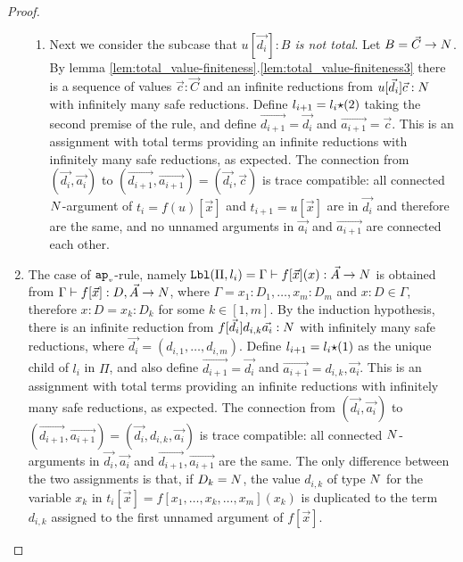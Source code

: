 \begin{proof}
\begin{enumerate}
\begin{enumerate}
\item
  Next we consider the subcase that \emph{$u[\vec{d_i}]:B$ is not total}.
  Let $B = \vec{C}\rightarrow{N}$.
  By lemma \ref{lem:total_value-finiteness}.\ref{lem:total_value-finiteness3}
  there is a sequence of values $\vec{c}:\vec{C}$ and an infinite reductions from 
  $u[\vec{d_i}]\vec{c}:{N}$ with infinitely many safe reductions.
  Define $l_{i+1}= l_i {\star} (2)$ taking the second premise of the rule,
  and define $\vec{d_{i+1}} = \vec{d_i}$ and $\vec{a_{i+1}} = \vec{c}$. 
  This is an assignment with total terms providing an infinite reductions with 
  infinitely many safe reductions, as expected.
  The connection from 
  $(\vec{d_i},\vec{a_i})$ to $(\vec{d_{i+1}},\vec{a_{i+1}}) = (\vec{d_i},\vec{c})$ is
  trace compatible: all connected ${N}$-argument of $t_{i} = f(u)[\vec{x}]$ and $t_{i+1}=u[\vec{x}]$ are 
  in $\vec{d_i}$ and therefore are the same, and no unnamed arguments in $\vec{a_i}$
  and $\vec{a_{i+1}}$ are connected each other.
 \end{enumerate}



\item
  The case of ${{\tt ap}_{\mbox{\tiny $v$}}}$-rule, namely 
  ${\tt Lbl}(\Pi,l_i) 
  = 
  \Gamma \vdash f[\vec{x}](x): \vec{A}\rightarrow{N}$ is obtained from
  $\Gamma \vdash f[\vec{x}]: D,\vec{A} \rightarrow {N}$,
  where $\Gamma=x_1:D_1,\ldots,x_m:D_m$ and $x:D\in\Gamma$, therefore
  $x:D = x_k:D_k$ for some $k \in [1,m]$. 
  By the induction hypothesis, there is an infinite reduction from $f[\vec{d_i}]d_{i,k}\vec{a_i}:{N}$
  with infinitely many safe reductions,
  where $\vec{d_i} = (d_{i,1},\ldots,d_{i,m})$. 
  Define $l_{i+1}=l_i{\star}(1)$ as the unique child of $l_i$ in $\Pi$, and
  also define $\vec{d_{i+1}} = \vec{d_i}$ and $\vec{a_{i+1}} = d_{i,k},\vec{a_i}$. 
  This is an assignment with total terms providing an infinite reductions with 
  infinitely many safe reductions, as expected.
  The connection from
  $(\vec{d_i},\vec{a_i})$ to
  $(\vec{d_{i+1}},\vec{a_{i+1}}) = (\vec{d_i},d_{i,k},\vec{a_i})$
  is trace compatible: all connected ${N}$-arguments in $\vec{d_i},\vec{a_i}$ and 
  $\vec{d_{i+1}},\vec{a_{i+1}}$ are the same.  
  The only difference between the two assignments
  is that, if $D_k = {N}$, the value $d_{i,k}$ of type ${N}$ for the variable $x_k$
  in $t_i[\vec{x}]=f[x_1,\ldots,x_k,\ldots,x_m](x_k)$ is duplicated to the term $d_{i,k}$ 
  assigned to the first unnamed argument of $ f[\vec{x}]$. 



\end{enumerate}
\end{proof}
